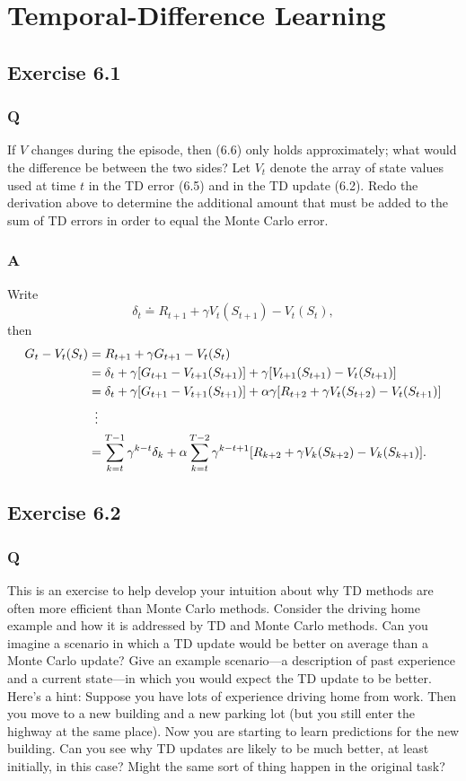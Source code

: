\section{Temporal-Difference Learning}

\subsection{Exercise 6.1}
\subsubsection*{Q}
If $V$ changes during the episode, then (6.6) only holds approximately; what would the difference be between the two sides? Let $V_t$ denote the array of state values used at time $t$ in the TD error (6.5) and in the TD update (6.2). Redo the derivation above to determine the additional amount that must be added to the sum of TD errors in order to equal the Monte Carlo error.
\subsubsection*{A}
Write
\[
    \delta_t \doteq R_{t+1} + \gamma V_t(S_{t+1}) - V_t(S_t),
\]
then
\begin{align}
    G_t - V_t(S_t) &= R_{t+1} + \gamma G_{t+1} - V_t(S_t) \\
                   &= \delta_t + \gamma [ G_{t+1} - V_{t+1}(S_{t+1})] + \gamma [V_{t+1}(S_{t+1}) - V_t(S_{t+1})]\\
                   &= \delta_t + \gamma [ G_{t+1} - V_{t+1}(S_{t+1})] + \alpha \gamma [R_{t+2} + \gamma V_t(S_{t+2}) - V_t(S_{t+1})]\\
                   &\vdotswithin{=} \notag\\
                   &= \sum_{k=t}^{T-1} \gamma^{k-t} \delta_k + \alpha \sum_{k=t}^{T-2} \gamma^{k-t+1} [R_{k+2} + \gamma V_k(S_{k+2}) - V_k(S_{k+1})].
\end{align}
                   
\subsection{Exercise 6.2}
\subsubsection*{Q}
This is an exercise to help develop your intuition about why TD methods are often more efficient than Monte Carlo methods. Consider the driving home example and how it is addressed by TD and Monte Carlo methods. Can you imagine a scenario in which a TD update would be better on average than a Monte Carlo update? Give an example scenario—a description of past experience and a current state—in which you would expect the TD update to be better. Here’s a hint: Suppose you have lots of experience driving home from work. Then you move to a new building and a new parking lot (but you still enter the highway at the same place). Now you are starting to learn predictions for the new building. Can you see why TD updates are likely to be much better, at least initially, in this case? Might the same sort of thing happen in the original task?
